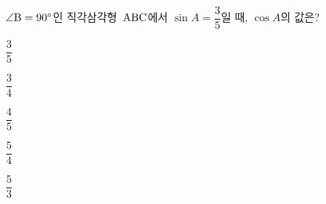 $\angle\mathrm{B}=90^\circ$인 직각삼각형~$\mathrm{ABC}$에서 $\sin A=\dfrac{3}{5}$일 때, $\cos A$의 값은?
\begin{choices32}{\rule[-3ex]{0pt}{8ex}$\dfrac{3}{5}$}{\rule[-3ex]{0pt}{8ex}$\dfrac{3}{4}$}{\rule[-3ex]{0pt}{8ex}$\dfrac{4}{5}$}{\rule[-3ex]{0pt}{8ex}$\dfrac{5}{4}$}{\rule[-3ex]{0pt}{8ex}$\dfrac{5}{3}$}\end{choices32}
